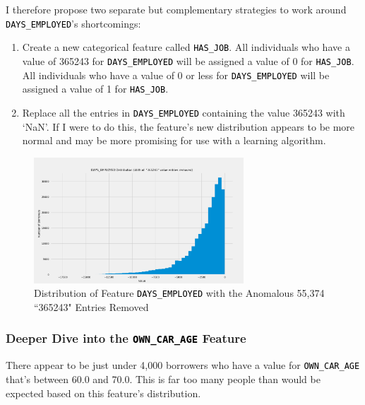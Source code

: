 \documentclass[12pt, letterpaper]{article}
\begin{document}
I therefore propose two separate but complementary strategies to work around \colorbox{backcolor}{\textcolor{black}{\texttt{DAYS_EMPLOYED}}}'s shortcomings:

\begin{enumerate}
 \item Create a new categorical feature called \colorbox{backcolor}{\textcolor{black}{\texttt{HAS_JOB}}}. All individuals who have a value of 365243 for \colorbox{backcolor}{\textcolor{black}{\texttt{DAYS_EMPLOYED}}} will be assigned a value of 0 for \colorbox{backcolor}{\textcolor{black}{\texttt{HAS_JOB}}}. All individuals who have a value of 0 or less for \colorbox{backcolor}{\textcolor{black}{\texttt{DAYS_EMPLOYED}}} will be assigned a value of 1 for \colorbox{backcolor}{\textcolor{black}{\texttt{HAS_JOB}}}.
 \item Replace all the entries in \colorbox{backcolor}{\textcolor{black}{\texttt{DAYS_EMPLOYED}}} containing the value 365243 with `NaN'. If I were to do this, the feature's new distribution appears to be more normal and may be more promising for use with a learning algorithm.
\end{enumerate}

\begin{figure}[ht]
\includegraphics[width=0.7\textwidth]{distribDAYSEMPLOYEDMODIFIED}
\centering
\caption{Distribution of Feature \colorbox{backcolor}{\textcolor{black}{\texttt{DAYS_EMPLOYED}}} with the Anomalous 55,374 ``365243" Entries Removed}
\end{figure}

\subsubsection{Deeper Dive into the \colorbox{backcolor}{\textcolor{black}{\texttt{OWN_CAR_AGE}}} Feature}
There appear to be just under 4,000 borrowers who have a value for \colorbox{backcolor}{\textcolor{black}{\texttt{OWN_CAR_AGE}}} that's between 60.0 and 70.0. This is far too many people than would be expected based on this feature's distribution.
\end{document}
